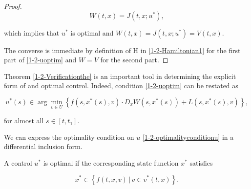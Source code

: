 \begin{theorem}
\begin{proof}
        \[W(t,x) = J(t,x;u^{\ast}),\]

        which implies that $u^{\ast}$ is optimal and $W(t,x)=J(t,x;u^{\ast})=V(t,x)$.

        The converse is immediate by definition of H in \eqref{1-2-Hamiltonian1} for the first part of \eqref{1-2-uoptim} and $W=V$ for the second part.

    \end{proof} 
\end{theorem}


Theorem \ref{1-2-Verificationthe} is an important tool in determining the explicit form of and optimal control. 
Indeed, condition \eqref{1-2-uoptim} can be restated as

\begin{equation}\label{1-2-optimalityconditionu}
        u^{\ast}(s) \in \arg\min_{v\in U} \left\{ f(s,x^{\ast}(s),v) \cdot D_xW(s,x^{\ast}(s)) + L(s,x^{\ast}(s),v)\right\},
\end{equation}

for almost all $s\in[t,t_1]$.

We can express the optimality condition on $u$ \eqref{1-2-optimalityconditionu} in a differential inclusion form. 

\begin{corollary}
    A control $u^{\ast}$ is optimal if the corresponding state function $x^{\ast}$ satisfies

    \begin{equation}
        x^{\ast} \in \left\{f(t,x,v) \,|\, v\in v^{\ast}(t,x)\right\}.
    \end{equation}
\end{corollary}